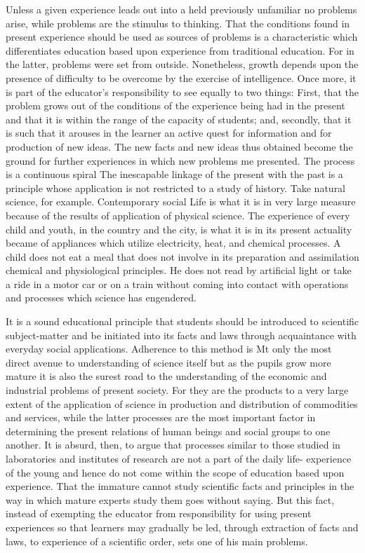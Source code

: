Unless a given experience leads out into a held previously unfamiliar no problems 
arise, while problems are the stimulus to thinking. That the conditions found in present 
experience should be used as sources of problems is a characteristic which differentiates 
education based upon experience from traditional education. For in the latter, problems 
were set from outside. Nonetheless, growth depends upon the presence of difficulty to be 
overcome by the exercise of intelligence. Once more, it is part of the educator's 
responsibility to see equally to two things: First, that the problem grows out of the 
conditions of the experience being had in the present and that it is within the range of the 
capacity of students; and, secondly, that it is such that it arouses in the learner an active 
quest for information and for production of new ideas. The new facts and new ideas thus 
obtained become the ground for further experiences in which new problems me 
presented. The process is a continuous spiral The inescapable linkage of the present with 
the past is a principle whose application is not restricted to a study of history. Take 
natural science, for example. Contemporary social Life is what it is in very large measure 
because of the results of application of physical science. The experience of every child 
and youth, in the country and the city, is what it is in its present actuality became of 
appliances which utilize electricity, heat, and chemical processes. A child does not eat a 
meal that does not involve in its preparation and assimilation chemical and physiological 
principles. He does not read by artificial light or take a ride in a motor car or on a train 
without coming into contact with operations and processes which science has 
engendered. 

It is a sound educational principle that students should be introduced to scientific 
subject-matter and be initiated into its facts and laws through acquaintance with everyday social applications. Adherence to this method is Mt only the most direct avenue to 
understanding of science itself but as the pupils grow more mature it is also the surest 
road to the understanding of the economic and industrial problems of present society. For 
they are the products to a very large extent of the application of science in production and 
distribution of commodities and services, while the latter processes are the most 
important factor in determining the present relations of human beings and social groups 
to one another. It is absurd, then, to argue that processes similar to those studied in 
laboratories and institutes of research are not a part of the daily life- experience of the 
young and hence do not come within the scope of education based upon experience. That 
the immature cannot study scientific facts and principles in the way in which mature 
experts study them goes without saying. But this fact, instead of exempting the educator 
from responsibility for using present experiences so that learners may gradually be led, 
through extraction of facts and laws, to experience of a scientific order, sets one of his 
main problems. 

